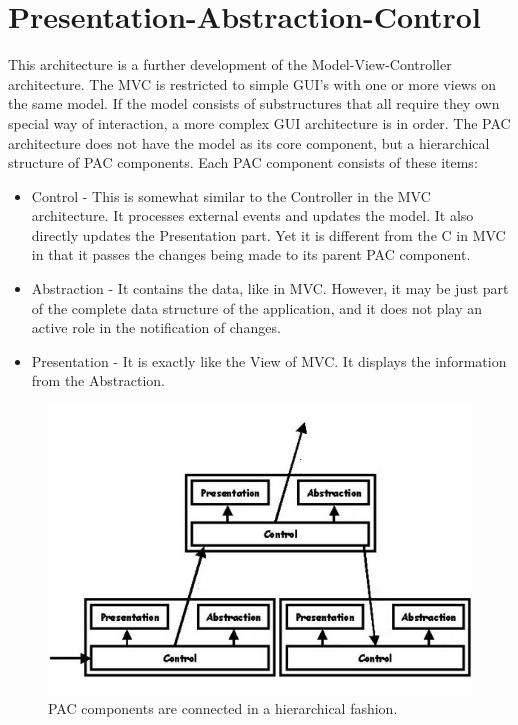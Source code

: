 \documentclass{article}
\begin{document}
\section{Presentation-Abstraction-Control}

This architecture is a further development of the Model-View-Controller architecture. The MVC is restricted to simple GUI's with one or more views on the same model. If the model consists of substructures that all require they own special way of interaction, a more complex GUI architecture is in order. The PAC architecture does not have the model as its core component, but a hierarchical structure of PAC components. Each PAC component consists of these items:

\begin{itemize}

\item Control - This is somewhat similar to the Controller in the MVC architecture. It processes external events and updates the model. It also directly updates the Presentation part. Yet it is different from the C in MVC in that it passes the changes being made to its parent PAC component.
\item Abstraction - It contains the data, like in MVC. However, it may be just part of the complete data structure of the application, and it does not play an active role in the notification of changes.
\item Presentation - It is exactly like the View of MVC. It displays the information from the Abstraction.

\end{itemize}

\begin{figure}[h]
\centering
\includegraphics[scale=0.65]{pac.jpg}
\caption{PAC components are connected in a hierarchical fashion.}
\label{fig_pac}
\end{figure}
\end{document}
